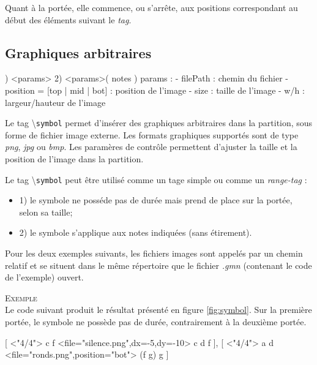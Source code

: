 \documentclass{article}
\newenvironment{gmncode}	{\vspace{-2mm}\small\verbatim}{\endverbatim\vspace{-2mm}}
\newcommand{\code}[1]		{{\small \texttt{#1}}}
\newcommand{\guidotag}[1]	{\textbackslash\code{#1}}
\newcommand{\exemple}		{\vspace{2mm}\hspace*{-6mm}\textsc{Exemple}}
\begin{document}
Quant à la portée, elle commence, ou s'arrête, aux positions correspondant au début des éléments suivant le \emph{tag}.


\subsection{Graphiques arbitraires}\label{subsec:graphiquesAbstraites}
\bigskip

\begin{gmncode}
1) \symbol<params>
2) \symbol<params>( notes )
  params : 
    - filePath : chemin du fichier
    - position = [top | mid | bot] :
      position de l'image
    - size : taille de l'image
    - w/h : largeur/hauteur de l'image
\end{gmncode}

Le tag \guidotag{symbol} permet d'insérer des graphiques arbitraires dans la partition, sous forme de fichier image externe. Les formats graphiques supportés sont de type \emph{png}, \emph{jpg} ou \emph{bmp}. Les paramères de contrôle permettent d'ajuster la taille et la position de l'image dans la partition.

Le tag \guidotag{symbol} peut être utilisé comme un tage simple ou comme un \emph{range-tag} :
\begin{itemize}
	\item 1) le symbole ne posséde pas de durée mais prend de place sur la portée, selon sa taille;
	\item 2) le symbole s'applique aux notes indiquées (sans étirement).
\end{itemize}

Pour les deux exemples suivants, les fichiers images sont appelés par un chemin relatif et se situent dans le même répertoire que le fichier \emph{.gmn} (contenant le code de l'exemple) ouvert.

\exemple\\
Le code suivant produit le résultat présenté en figure \ref{fig:symbol}. Sur la première portée, le symbole ne possède pas de durée, contrairement à la deuxième portée.

\begin{gmncode}
{
  [
    \meter<"4/4"> c f
  \symbol<file="silence.png",dx=-5,dy=-10> 
    c d f
  ],
  [
    \meter<"4/4"> a d
  \symbol<file="ronds.png",position="bot"> 
  (f g) g
  ]
}
\end{gmncode}
\end{document}
